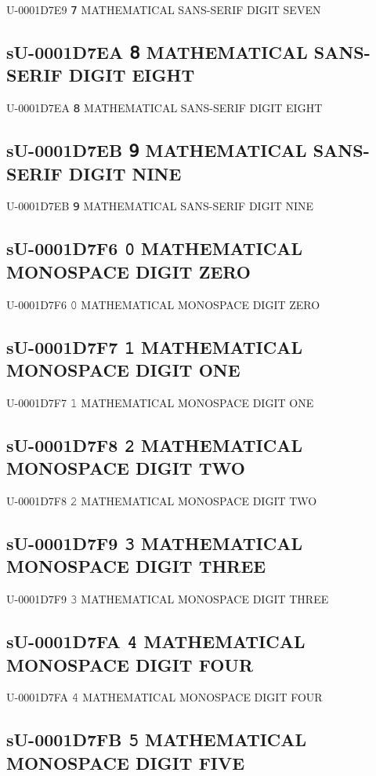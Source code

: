 U-0001D7E9 𝟩 MATHEMATICAL SANS-SERIF DIGIT SEVEN

\subsection{sU-0001D7EA 𝟪 MATHEMATICAL SANS-SERIF DIGIT EIGHT}

U-0001D7EA 𝟪 MATHEMATICAL SANS-SERIF DIGIT EIGHT

\subsection{sU-0001D7EB 𝟫 MATHEMATICAL SANS-SERIF DIGIT NINE}

U-0001D7EB 𝟫 MATHEMATICAL SANS-SERIF DIGIT NINE

\subsection{sU-0001D7F6 𝟶 MATHEMATICAL MONOSPACE DIGIT ZERO}

U-0001D7F6 𝟶 MATHEMATICAL MONOSPACE DIGIT ZERO

\subsection{sU-0001D7F7 𝟷 MATHEMATICAL MONOSPACE DIGIT ONE}

U-0001D7F7 𝟷 MATHEMATICAL MONOSPACE DIGIT ONE

\subsection{sU-0001D7F8 𝟸 MATHEMATICAL MONOSPACE DIGIT TWO}

U-0001D7F8 𝟸 MATHEMATICAL MONOSPACE DIGIT TWO

\subsection{sU-0001D7F9 𝟹 MATHEMATICAL MONOSPACE DIGIT THREE}

U-0001D7F9 𝟹 MATHEMATICAL MONOSPACE DIGIT THREE

\subsection{sU-0001D7FA 𝟺 MATHEMATICAL MONOSPACE DIGIT FOUR}

U-0001D7FA 𝟺 MATHEMATICAL MONOSPACE DIGIT FOUR

\subsection{sU-0001D7FB 𝟻 MATHEMATICAL MONOSPACE DIGIT FIVE}

